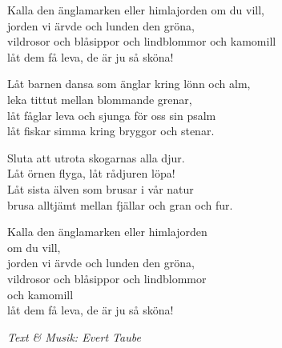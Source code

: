 \vspace{10pt}
Kalla den änglamarken eller himlajorden om du vill,\\
jorden vi ärvde och lunden den gröna,\\
vildrosor och blåsippor och lindblommor och kamomill\\
låt dem få leva, de är ju så sköna!\par
\vspace{10pt}
Låt barnen dansa som änglar kring lönn och alm,\\
leka tittut mellan blommande grenar,\\
låt fåglar leva och sjunga för oss sin psalm\\
låt fiskar simma kring bryggor och stenar.\par
\vspace{10pt}
Sluta att utrota skogarnas alla djur.\\
Låt örnen flyga, låt rådjuren löpa!\\
Låt sista älven som brusar i vår natur\\
brusa alltjämt mellan fjällar och gran och fur.\par
\vspace{10pt}
Kalla den änglamarken eller himlajorden\\
om du vill,\\
jorden vi ärvde och lunden den gröna,\\
vildrosor och blåsippor och lindblommor\\
och kamomill\\
låt dem få leva, de är ju så sköna!\par
\vspace{10pt}
{\footnotesize\textit{Text \& Musik: Evert Taube}}
